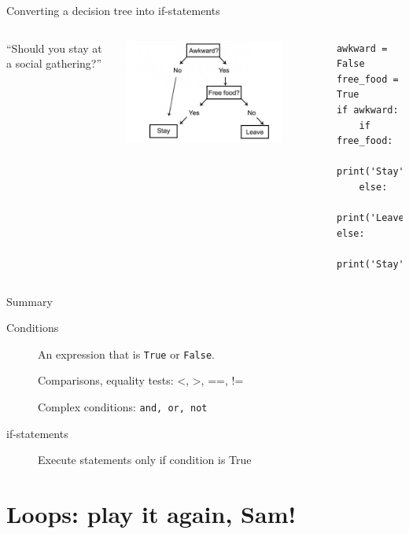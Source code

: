 \documentclass[aspectratio=169,usenames,dvipsnames]{beamer}
\begin{document}
\begin{frame}[fragile]{Converting a decision tree into if-statements}
    \begin{columns}
            ``Should you stay at a social gathering?''

            \includegraphics[width=0.8\textwidth]{fig/flowchart2}

        \pause
\begin{lstlisting}
awkward = False
free_food = True
if awkward:
    if free_food:
        print('Stay')
    else:
        print('Leave')
else:
    print('Stay')
\end{lstlisting}
\end{columns}
\end{frame}


\begin{frame}{Summary}
    \begin{description}
        \item[Conditions] An expression that is \texttt{True} or \texttt{False}.

                Comparisons, equality tests: <, >, ==, !=

                Complex conditions: \texttt{and, or, not}

        \item[if-statements] Execute statements only if condition is True
    \end{description}
\end{frame}


\section{Loops: play it again, Sam!}
\frame{\tableofcontents[currentsection]}
\end{document}
